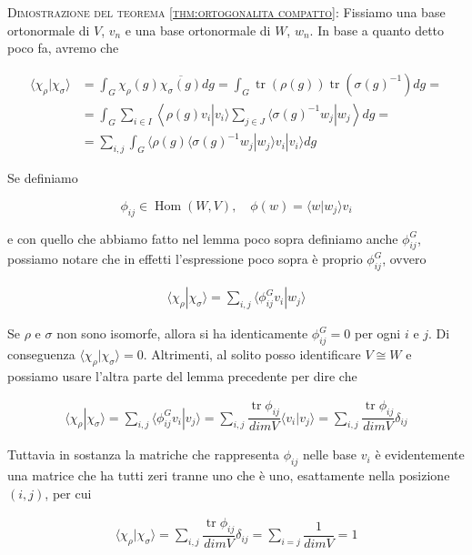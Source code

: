 \documentclass[11pt]{article}
\theoremstyle{plain}
\theoremstyle{definition}
\theoremstyle{remark}
\newcommand{\dsum}{\displaystyle\sum}
\newcommand{\dint}{\displaystyle\int}
\DeclareMathOperator{\tr}{tr}
\DeclareMathOperator{\Hom}{Hom}
\begin{document}
 \textsc{Dimostrazione del teorema \ref{thm:ortogonalita compatto}:}
 Fissiamo una base ortonormale di $V$, $v_n$ e una base ortonormale di $W$, $w_n$. In base a quanto detto poco fa, avremo che

 \begin{align*}
   \langle \chi_\rho | \chi_\sigma \rangle &= \dint_G \chi_\rho(g) \overline{\chi_\sigma(g)} dg = \dint_G \tr(\rho(g)) \tr(\sigma(g)^{-1}) dg = \\
   &= \dint_G \dsum_{i \in I} \left\langle \rho(g) v_i | v_i \rangle \dsum_{j \in J} \langle \sigma(g)^{-1} w_j | w_j \right\rangle dg = \\
   &= \dsum_{i,j} \dint_G \langle \rho(g) \langle \sigma(g)^{-1} w_j | w_j \rangle v_i | v_i \rangle dg 
 \end{align*} 

 Se definiamo

 \[ \phi_{ij} \in \Hom(W, V), \quad \phi(w) = \langle w | w_j \rangle v_i \]

 e con quello che abbiamo fatto nel lemma poco sopra definiamo anche $\phi^G_{ij}$, possiamo notare che in effetti l'espressione poco sopra è proprio $\phi^G_{ij}$, ovvero

 \begin{align*}
   \langle \chi_\rho | \chi_\sigma \rangle = \dsum_{i,j} \langle \phi_{ij}^G v_i | w_j \rangle
 \end{align*}

 Se $\rho$ e $\sigma$ non sono isomorfe, allora si ha identicamente $\phi_{ij}^G = 0$ per ogni $i$ e $j$. Di conseguenza $\langle \chi_\rho | \chi_\sigma \rangle = 0$. Altrimenti, al solito posso identificare $V \cong W$ e possiamo usare l'altra parte del lemma precedente per dire che

\begin{align*}
   \langle \chi_\rho | \chi_\sigma \rangle = \dsum_{i,j} \langle \phi_{ij}^G v_i | v_j \rangle = \dsum_{i,j} \dfrac{\tr \phi_{ij}}{dimV} \langle v_i | v_j \rangle = \dsum_{i,j } \dfrac{\tr\phi_{ij}}{dimV} \delta_{ij} 
 \end{align*}

Tuttavia in sostanza la matriche che rappresenta $\phi_{ij}$ nelle base $v_i$ è evidentemente una matrice che ha tutti zeri tranne uno che è uno, esattamente nella posizione $(i,j)$, per cui


\begin{align*}
   \langle \chi_\rho | \chi_\sigma \rangle = \dsum_{i,j } \dfrac{\tr\phi_{ij}}{dimV} \delta_{ij} = \dsum_{i=j} \dfrac{1}{dimV} = 1
 \end{align*}
\end{document}
